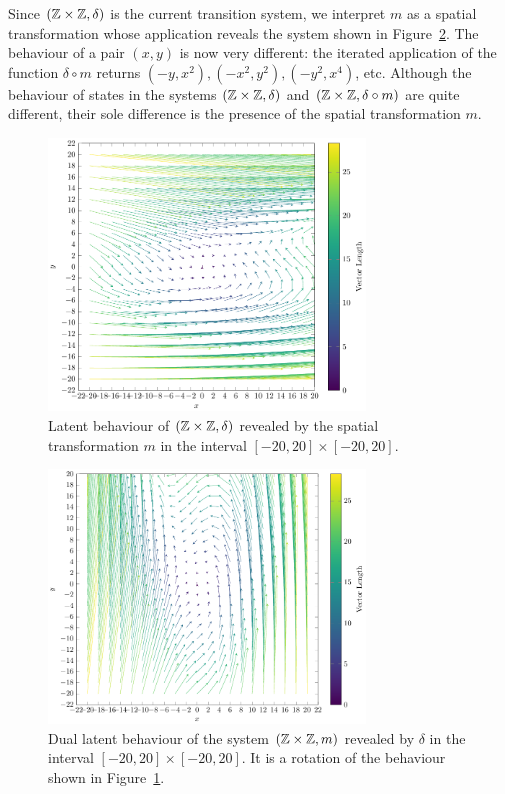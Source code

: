 Since $(\mathbb{Z}\times\mathbb{Z}, \delta)$ is the current transition system, we interpret $m$ as a spatial transformation whose application reveals the system shown in Figure~\ref{fig:SecondLatent}. %
The behaviour of a pair $(x,y)$ is now very different: the iterated application of the function $\delta\circ m$ returns $(-y,x^2),(-x^2,y^2),(-y^2,x^4)$, etc. Although the behaviour of states in the systems $(\mathbb{Z}\times\mathbb{Z}, \delta)$ and $(\mathbb{Z}\times\mathbb{Z}, \delta\circ m)$ are quite different, their sole difference is the presence of the spatial transformation $m$. 
\begin{figure}[!t]
  \centering
  \includegraphics[width=0.75\textwidth]{Figures/VectorSpace4.pdf} 
  \caption{Latent behaviour of $(\mathbb{Z}\times\mathbb{Z}, \delta)$ revealed by the spatial transformation $m$ in the interval $[-20,20]\times[-20,20]$.}
  \label{fig:FirstLatent}
\end{figure} 
\begin{figure}[!t]
  \centering
  \includegraphics[width=0.75\textwidth]{Figures/VectorSpace3.pdf} 
  \caption{Dual latent behaviour of the system $(\mathbb{Z}\times\mathbb{Z}, m)$ revealed by $\delta$ in the interval $[-20,20]\times[-20,20]$. It is a rotation of the behaviour shown in Figure~\ref{fig:FirstLatent}.}
  \label{fig:SecondLatent} 
\end{figure}

